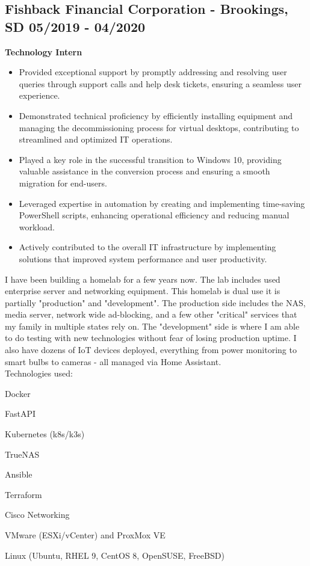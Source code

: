 \documentclass[a4paper,10pt]{article}
\begin{document}
\subsection*{Fishback Financial Corporation - Brookings, SD \hfill 05/2019 - 04/2020}
\textbf{Technology Intern}
\begin{itemize}
    \leftskip=4em
	\item Provided exceptional support by promptly addressing and resolving user queries through support calls and help desk tickets, ensuring a seamless user experience.
    \item Demonstrated technical proficiency by efficiently installing equipment and managing the decommissioning process for virtual desktops, contributing to streamlined and optimized IT operations.
    \item Played a key role in the successful transition to Windows 10, providing valuable assistance in the conversion process and ensuring a smooth migration for end-users.
    \item Leveraged expertise in automation by creating and implementing time-saving PowerShell scripts, enhancing operational efficiency and reducing manual workload.
    \item Actively contributed to the overall IT infrastructure by implementing solutions that improved system performance and user productivity.
\end{itemize}

I have been building a homelab for a few years now. The lab includes used enterprise server and networking equipment. This homelab is dual use it is partially "production" and "development". The production side includes the NAS, media server, network wide ad-blocking, and a few other "critical" services that my family in multiple states rely on. The "development" side is where I am able to do testing with new technologies without fear of losing production uptime. I also have dozens of IoT devices deployed, everything from power monitoring to smart bulbs to cameras - all managed via Home Assistant. 
\\
Technologies used:
\begin{itemize}
    \begin{multicols}{2}
    \item Docker
    \item FastAPI
    \item Kubernetes (k8s/k3s)
    \item TrueNAS
    \item Ansible
    \item Terraform
    \item Cisco Networking
    \item VMware (ESXi/vCenter) and ProxMox VE
    \item Linux (Ubuntu, RHEL 9, CentOS 8, OpenSUSE, FreeBSD)
    \end{multicols}
\end{itemize}
\end{document}
